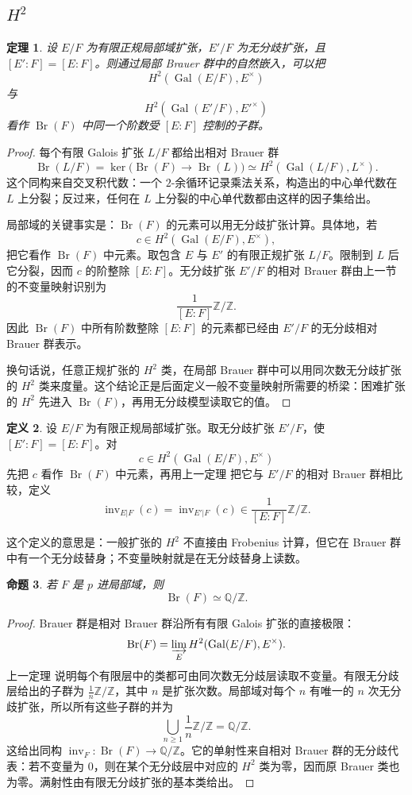 \documentclass[11pt,a4paper,openany]{ctexbook}
\numberwithin{equation}{chapter}
\newcommand{\Q}{\mathbb{Q}}
\newcommand{\Z}{\mathbb{Z}}
\newcommand{\Gal}{\operatorname{Gal}}
\newcommand{\Br}{\operatorname{Br}}
\theoremstyle{plain}
\newtheorem{theorem}{定理}[chapter]
\newtheorem{proposition}[theorem]{命题}
\theoremstyle{definition}
\newtheorem{definition}[theorem]{定义}
\theoremstyle{remark}
\begin{document}
\subsection{\texorpdfstring{$H^2$}{H2}}

\begin{theorem}
设 $E/F$ 为有限正规局部域扩张，$E'/F$ 为无分歧扩张，且 $[E':F]=[E:F]$。则通过局部 Brauer 群中的自然嵌入，可以把
\[
H^2(\Gal(E/F),E^\times)
\]
与
\[
H^2(\Gal(E'/F),E'^\times)
\]
看作 $\Br(F)$ 中同一个阶数受 $[E:F]$ 控制的子群。
\end{theorem}

\begin{proof}
每个有限 Galois 扩张 $L/F$ 都给出相对 Brauer 群
\[
\Br(L/F)=\ker\bigl(\Br(F)\to\Br(L)\bigr)
\simeq H^2(\Gal(L/F),L^\times).
\]
这个同构来自交叉积代数：一个 $2$-余循环记录乘法关系，构造出的中心单代数在 $L$ 上分裂；反过来，任何在 $L$ 上分裂的中心单代数都由这样的因子集给出。

局部域的关键事实是：$\Br(F)$ 的元素可以用无分歧扩张计算。具体地，若
\[
c\in H^2(\Gal(E/F),E^\times),
\]
把它看作 $\Br(F)$ 中元素。取包含 $E$ 与 $E'$ 的有限正规扩张 $L/F$。限制到 $L$ 后它分裂，因而 $c$ 的阶整除 $[E:F]$。无分歧扩张 $E'/F$ 的相对 Brauer 群由上一节的不变量映射识别为
\[
\frac1{[E:F]}\Z/\Z.
\]
因此 $\Br(F)$ 中所有阶数整除 $[E:F]$ 的元素都已经由 $E'/F$ 的无分歧相对 Brauer 群表示。

换句话说，任意正规扩张的 $H^2$ 类，在局部 Brauer 群中可以用同次数无分歧扩张的 $H^2$ 类来度量。这个结论正是后面定义一般不变量映射所需要的桥梁：困难扩张的 $H^2$ 先进入 $\Br(F)$，再用无分歧模型读取它的值。
\end{proof}

\begin{definition}
设 $E/F$ 为有限正规局部域扩张。取无分歧扩张 $E'/F$，使 $[E':F]=[E:F]$。对
\[
c\in H^2(\Gal(E/F),E^\times)
\]
先把 $c$ 看作 $\Br(F)$ 中元素，再用上一定理 把它与 $E'/F$ 的相对 Brauer 群相比较，定义
\[
\operatorname{inv}_{E|F}(c)=\operatorname{inv}_{E'|F}(c)\in \frac1{[E:F]}\Z/\Z.
\]
\end{definition}

这个定义的意思是：一般扩张的 $H^2$ 不直接由 Frobenius 计算，但它在 Brauer 群中有一个无分歧替身；不变量映射就是在无分歧替身上读数。

\begin{proposition}
若 $F$ 是 $p$ 进局部域，则
\[
\Br(F)\simeq \Q/\Z.
\]
\end{proposition}

\begin{proof}
Brauer 群是相对 Brauer 群沿所有有限 Galois 扩张的直接极限：
\[
\Br(F)=\varinjlim_E H^2(\Gal(E/F),E^\times).
\]
上一定理 说明每个有限层中的类都可由同次数无分歧层读取不变量。有限无分歧层给出的子群为 $\frac1n\Z/\Z$，其中 $n$ 是扩张次数。局部域对每个 $n$ 有唯一的 $n$ 次无分歧扩张，所以所有这些子群的并为
\[
\bigcup_{n\ge1}\frac1n\Z/\Z=\Q/\Z.
\]
这给出同构 $\operatorname{inv}_F:\Br(F)\to\Q/\Z$。它的单射性来自相对 Brauer 群的无分歧代表：若不变量为 $0$，则在某个无分歧层中对应的 $H^2$ 类为零，因而原 Brauer 类也为零。满射性由有限无分歧扩张的基本类给出。
\end{proof}
\end{document}
